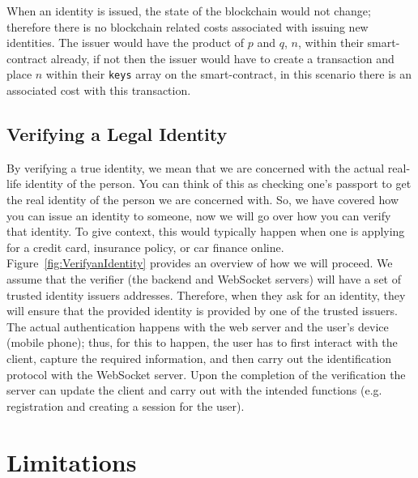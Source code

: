 When an identity is issued, the state of the blockchain would not change; therefore there is no blockchain related costs associated with issuing new identities. The issuer would have the product of $p$ and $q$, $n$, within their smart-contract already, if not then the issuer would have to create a transaction and place $n$ within their \texttt{keys} array on the smart-contract, in this scenario there is an associated cost with this transaction.

\subsection{Verifying a Legal Identity}

By verifying a true identity, we mean that we are concerned with the actual real-life identity of the person. You can think of this as checking one's passport to get the real identity of the person we are concerned with. So, we have covered how you can issue an identity to someone, now we will go over how you can verify that identity. To give context, this would typically happen when one is applying for a credit card, insurance policy, or car finance online. Figure~\ref{fig:VerifyanIdentity} provides an overview of how we will proceed. We assume that the verifier (the backend and WebSocket servers) will have a set of trusted identity issuers \deeid addresses. Therefore, when they ask for an identity, they will ensure that the provided identity is provided by one of the trusted issuers. The actual authentication happens with the web server and the user's device (mobile phone); thus, for this to happen, the user has to first interact with the client, capture the required information, and then carry out the identification protocol with the WebSocket server. Upon the completion of the verification the server can update the client and carry out with the intended functions (e.g. registration and creating a session for the user).











\section{Limitations}
\label{sec::chp6::limitations}

